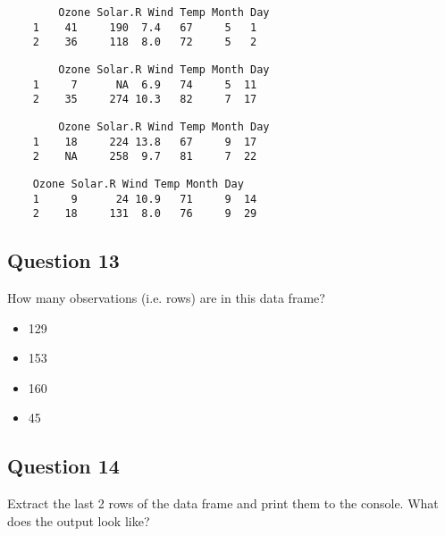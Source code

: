 \documentclass[12pt]{article}
\begin{document}
\begin{framed}
	\begin{verbatim}
		Ozone Solar.R Wind Temp Month Day
	1    41     190  7.4   67     5   1
	2    36     118  8.0   72     5   2
	\end{verbatim}
\end{framed}
\begin{framed}
	\begin{verbatim} 
		Ozone Solar.R Wind Temp Month Day
	1     7      NA  6.9   74     5  11
	2    35     274 10.3   82     7  17
	\end{verbatim}
\end{framed}
\begin{framed}
	\begin{verbatim} 
		Ozone Solar.R Wind Temp Month Day
	1    18     224 13.8   67     9  17
	2    NA     258  9.7   81     7  22
\end{verbatim}
\end{framed}	\begin{framed}
	\begin{verbatim} 
	Ozone Solar.R Wind Temp Month Day
	1     9      24 10.9   71     9  14
	2    18     131  8.0   76     9  29
	\end{verbatim}
\end{framed}

\newpage

\subsection*{Question 13}
\Large
How many observations (i.e. rows) are in this data frame?
\begin{itemize}
	\item 129
	\item 153
	\item 160
	\item 45
\end{itemize}

\newpage
\subsection*{Question 14}
\Large
Extract the last 2 rows of the data frame and print them to the console. What does the output look like?
\end{document}
